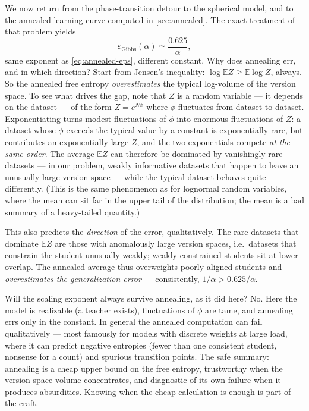 \documentclass[11pt]{article}
\newcommand{\E}{\mathbb{E}}
\begin{document}
We now return from the phase-transition detour to the spherical model, and
to the annealed learning curve computed in \cref{sec:annealed}. The exact
treatment of that problem
\cite{seung1992statistical,engel2001statistical} yields
\begin{equation}
  \label{eq:quenched-eps}
  \varepsilon_{\mathrm{Gibbs}}(\alpha) \simeq \frac{0.625}{\alpha},
\end{equation}
same exponent as \cref{eq:annealed-eps}, different constant. Why does
annealing err, and in which direction? Start from Jensen's inequality:
$\log \E Z \geq \E \log Z$, always. So the annealed free entropy
\emph{overestimates} the typical log-volume of the version space. To see
what drives the gap, note that $Z$ is a random variable --- it depends on
the dataset --- of the form $Z = e^{N\phi}$ where $\phi$ fluctuates from
dataset to dataset. Exponentiating turns modest fluctuations of $\phi$ into
enormous fluctuations of $Z$: a dataset whose $\phi$ exceeds the typical
value by a constant is exponentially rare, but contributes an exponentially
large $Z$, and the two exponentials compete \emph{at the same order}. The
average $\E Z$ can therefore be dominated by vanishingly rare datasets ---
in our problem, weakly informative datasets that happen to leave an
unusually large version space --- while the typical dataset behaves quite
differently. (This is the same phenomenon as for lognormal random
variables, where the mean can sit far in the upper tail of the
distribution; the mean is a bad summary of a heavy-tailed quantity.)

This also predicts the \emph{direction} of the error, qualitatively.
The rare datasets that dominate $\E Z$ are those with anomalously large
version spaces, i.e.\ datasets that constrain the student unusually weakly;
weakly constrained students sit at lower overlap. The annealed average thus
overweights poorly-aligned students and \emph{overestimates the
generalization error} --- consistently, $1/\alpha > 0.625/\alpha$.

Will the scaling exponent always survive annealing, as it did here? No.
Here the model is realizable (a teacher exists), fluctuations of $\phi$ are
tame, and annealing errs only in the constant. In general the annealed
computation can fail qualitatively --- most famously for models with
discrete weights at large load, where it can predict negative entropies
(fewer than one consistent student, nonsense for a count) and spurious
transition points. The safe summary: annealing is a cheap upper bound on
the free entropy, trustworthy when the version-space volume concentrates,
and diagnostic of its own failure when it produces absurdities. Knowing
when the cheap calculation is enough is part of the craft.
\end{document}
